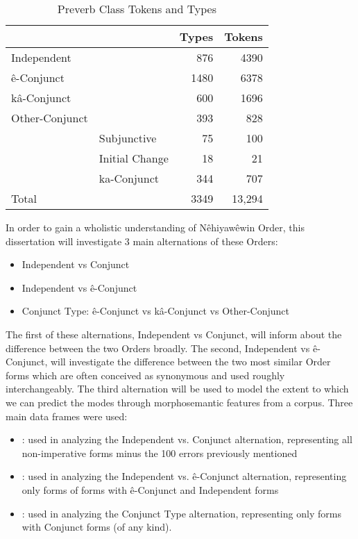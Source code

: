 \begin{table}
\centering
\begin{tabular}{llrr} \\
\toprule
            &   & Types & Tokens \\
\midrule
Independent    &                      &  876  & 4390   \\
ê-Conjunct     &                      & 1480  & 6378   \\
kâ-Conjunct    &                      &  600  & 1696   \\
Other-Conjunct &                      &  393    & 828   \\
               & Subjunctive          &  75   & 100      \\
               & Initial Change       &  18   & 21      \\
               & ka-Conjunct          &  344 & 707      \\
               
\midrule
Total & &  3349  & 13,294   \\
\bottomrule
\end{tabular}
\caption{Preverb Class Tokens and Types \label{tab:corporder}
}
\end{table}

In order to gain a wholistic understanding of Nêhiyawêwin Order, this dissertation will investigate 3 main alternations of these Orders:

\begin{itemize}
    \item Independent vs Conjunct
    \item Independent vs ê-Conjunct
    \item Conjunct Type: ê-Conjunct vs kâ-Conjunct vs Other-Conjunct
\end{itemize}

The first of these alternations, Independent vs Conjunct, will inform about the difference between the two Orders broadly. The second, Independent vs ê-Conjunct, will investigate the difference between the two most similar Order forms which are often conceived as synonymous and used roughly interchangeably. The third alternation will be used to model the extent to which we can predict the modes through morphosemantic features from a corpus. Three main data frames were used:

\begin{itemize}
    \item {}: used in analyzing the Independent vs. Conjunct alternation, representing all non-imperative forms minus the 100 errors previously mentioned
    \item {}: used in analyzing the Independent vs. ê-Conjunct alternation, representing only forms of forms with ê-Conjunct and Independent forms
    \item {}: used in analyzing the Conjunct Type alternation, representing only forms with Conjunct forms (of any kind). 
\end{itemize}

